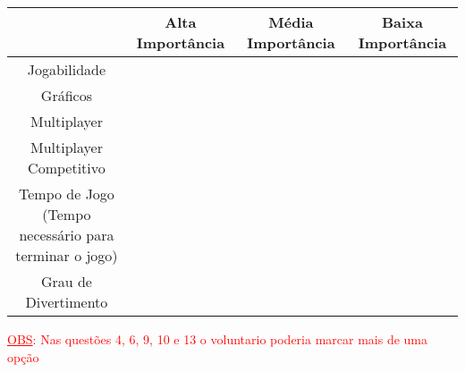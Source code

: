 \documentclass[11pt,a4paper]{article}
\begin{document}
\begin{question}
\begin{center}
  \begin{tabular}{| c | c | c | c | }
    \hline
    & Alta Importância & Média Importância & Baixa Importância\\ 
    \hline
    \hline
    Jogabilidade & & & \\ \hline
	Gráficos  & & &\\
    \hline
    Multiplayer & & & \\
    \hline
    Multiplayer Competitivo & & & \\
    \hline
    \makecell{	Tempo de Jogo (Tempo \\ necessário para terminar o jogo)}  & & &\\
    \hline
    Grau de Divertimento & & & \\
    \hline
  \end{tabular}
\end{center}
\end{question}
\textcolor{red}{\underline{OBS}: Nas questões 4, 6, 9, 10 e 13 o voluntario poderia marcar mais de uma opção}
\end{document}
